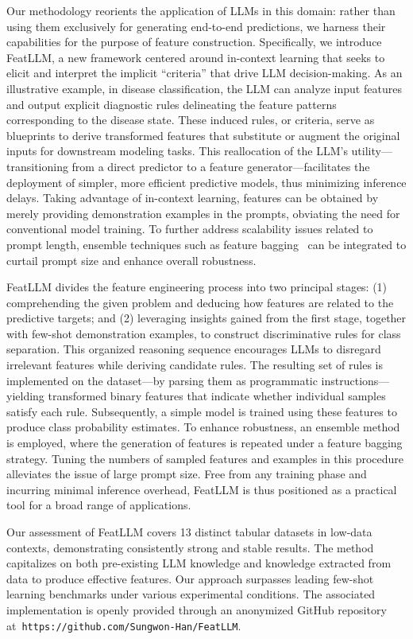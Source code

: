 Our methodology reorients the application of LLMs in this domain: rather than using them exclusively for generating end-to-end predictions, we harness their capabilities for the purpose of feature construction. Specifically, we introduce \textsf{FeatLLM}, a new framework centered around in-context learning that seeks to elicit and interpret the implicit “criteria” that drive LLM decision-making. As an illustrative example, in disease classification, the LLM can analyze input features and output explicit diagnostic rules delineating the feature patterns corresponding to the disease state. These induced rules, or criteria, serve as blueprints to derive transformed features that substitute or augment the original inputs for downstream modeling tasks. This reallocation of the LLM’s utility—transitioning from a direct predictor to a feature generator—facilitates the deployment of simpler, more efficient predictive models, thus minimizing inference delays. Taking advantage of in-context learning, features can be obtained by merely providing demonstration examples in the prompts, obviating the need for conventional model training. To further address scalability issues related to prompt length, ensemble techniques such as feature bagging~\cite{breiman2001random} can be integrated to curtail prompt size and enhance overall robustness.

\textsf{FeatLLM} divides the feature engineering process into two principal stages: (1) comprehending the given problem and deducing how features are related to the predictive targets; and (2) leveraging insights gained from the first stage, together with few-shot demonstration examples, to construct discriminative rules for class separation. This organized reasoning sequence encourages LLMs to disregard irrelevant features while deriving candidate rules. The resulting set of rules is implemented on the dataset—by parsing them as programmatic instructions—yielding transformed binary features that indicate whether individual samples satisfy each rule. Subsequently, a simple model is trained using these features to produce class probability estimates. To enhance robustness, an ensemble method is employed, where the generation of features is repeated under a feature bagging strategy. Tuning the numbers of sampled features and examples in this procedure alleviates the issue of large prompt size. Free from any training phase and incurring minimal inference overhead, \textsf{FeatLLM} is thus positioned as a practical tool for a broad range of applications.

Our assessment of \textsf{FeatLLM} covers 13 distinct tabular datasets in low-data contexts, demonstrating consistently strong and stable results. The method capitalizes on both pre-existing LLM knowledge and knowledge extracted from data to produce effective features. Our approach surpasses leading few-shot learning benchmarks under various experimental conditions. The associated implementation is openly provided through an anonymized GitHub repository at~\texttt{https://github.com/Sungwon-Han/FeatLLM}.

